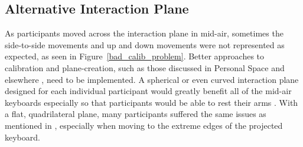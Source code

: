 \subsection{Alternative Interaction Plane} \label{alternative_interaction_plane}
As participants moved across the interaction plane in mid-air, sometimes the side-to-side movements and up and down movements were not represented as expected, as seen in Figure~\ref{bad_calib_problem}. Better approaches to calibration and plane-creation, such as those discussed in Personal Space and elsewhere  \cite{ref_alvin_thesis,ref_darren_thesis}, need to be implemented. A spherical or even curved interaction plane designed for each individual participant would greatly benefit all of the mid-air keyboards especially so that participants would be able to rest their arms \cite{ref_darren_thesis}. With a flat, quadrilateral plane, many participants suffered the same issues as mentioned in \cite{ref_alvin_thesis}, especially when moving to the extreme edges of the projected keyboard.

